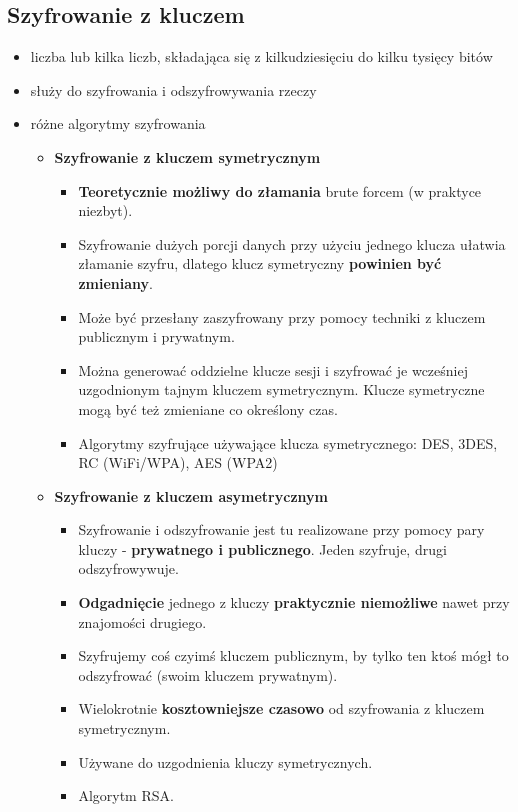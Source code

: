 \documentclass[../main.tex]{subfiles}
\begin{document}
    \subsection{Szyfrowanie z kluczem}
    \begin{itemize}
        \item liczba lub kilka liczb, składająca się z kilkudziesięciu do kilku tysięcy bitów
        \item służy do szyfrowania i odszyfrowywania rzeczy
        \item różne algorytmy szyfrowania
        \begin{itemize}
            \item \textbf{Szyfrowanie z kluczem symetrycznym}
            \begin{itemize}
                \item \textbf{Teoretycznie możliwy do złamania} brute forcem (w praktyce niezbyt).
                \item Szyfrowanie dużych porcji danych przy użyciu jednego klucza ułatwia złamanie
                szyfru, dlatego klucz symetryczny \textbf{powinien być zmieniany}.
                \item Może być przesłany zaszyfrowany przy pomocy techniki z kluczem
                publicznym i prywatnym.
                \item Można generować oddzielne klucze sesji i szyfrować je
                wcześniej uzgodnionym tajnym kluczem symetrycznym. Klucze symetryczne mogą być też
                zmieniane co określony czas.
                \item Algorytmy szyfrujące używające klucza symetrycznego: DES, 3DES, RC (WiFi/WPA), AES (WPA2)
            \end{itemize}
            \item \textbf{Szyfrowanie z kluczem asymetrycznym}
            \begin{itemize}
                \item Szyfrowanie i odszyfrowanie jest tu realizowane przy pomocy pary kluczy - \textbf{prywatnego
                i publicznego}. Jeden szyfruje, drugi odszyfrowywuje.
                \item \textbf{Odgadnięcie} jednego z kluczy \textbf{praktycznie niemożliwe} nawet przy znajomości drugiego.
                \item Szyfrujemy coś czyimś kluczem publicznym, by tylko ten ktoś mógł to odszyfrować (swoim kluczem prywatnym).
                \item Wielokrotnie \textbf{kosztowniejsze czasowo} od szyfrowania z kluczem symetrycznym.
                \item Używane do uzgodnienia kluczy symetrycznych.
                \item Algorytm RSA.
            \end{itemize}
        \end{itemize}

    \end{itemize}
\end{document}
